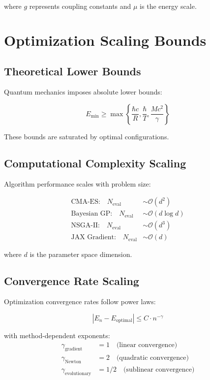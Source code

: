 \documentclass[12pt,a4paper]{article}
\begin{document}
where $g$ represents coupling constants and $\mu$ is the energy scale.

\section{Optimization Scaling Bounds}

\subsection{Theoretical Lower Bounds}

Quantum mechanics imposes absolute lower bounds:

\begin{equation}
E_{\text{min}} \geq \max\left\{\frac{\hbar c}{R}, \frac{\hbar}{T}, \frac{Mc^2}{\gamma}\right\}
\end{equation}

These bounds are saturated by optimal configurations.

\subsection{Computational Complexity Scaling}

Algorithm performance scales with problem size:

\begin{align}
\text{CMA-ES:} \quad N_{\text{eval}} &\sim \mathcal{O}(d^2) \\
\text{Bayesian GP:} \quad N_{\text{eval}} &\sim \mathcal{O}(d \log d) \\
\text{NSGA-II:} \quad N_{\text{eval}} &\sim \mathcal{O}(d^3) \\
\text{JAX Gradient:} \quad N_{\text{eval}} &\sim \mathcal{O}(d)
\end{align}

where $d$ is the parameter space dimension.

\subsection{Convergence Rate Scaling}

Optimization convergence rates follow power laws:

\begin{equation}
|E_n - E_{\text{optimal}}| \leq C \cdot n^{-\gamma}
\end{equation}

with method-dependent exponents:
\begin{align}
\gamma_{\text{gradient}} &= 1 \quad \text{(linear convergence)} \\
\gamma_{\text{Newton}} &= 2 \quad \text{(quadratic convergence)} \\
\gamma_{\text{evolutionary}} &= 1/2 \quad \text{(sublinear convergence)}
\end{align}
\end{document}
